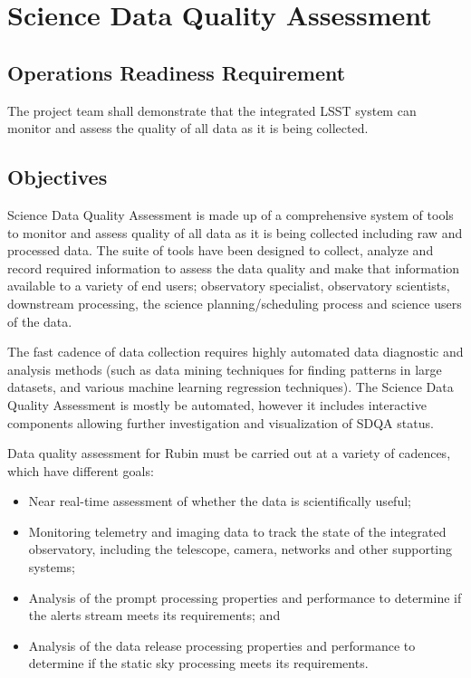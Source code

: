 \section{Science Data Quality Assessment}  \label{sec:sdqa}


\subsection{Operations Readiness Requirement}

The project team shall demonstrate that the integrated LSST system can monitor and assess the quality of all data as it is being collected.

\subsection{Objectives}

Science Data Quality Assessment is made up of a comprehensive system of tools to monitor and assess quality of all data as it is being collected including raw and processed data. The suite of tools have been designed to collect, analyze and record required information to assess the data quality and make that information available to a variety of end users; observatory specialist, observatory scientists, downstream processing, the science planning/scheduling process and science users of the data.

The fast cadence of data collection requires highly automated data diagnostic and analysis methods (such as data mining techniques for finding patterns in large datasets, and various machine learning regression techniques). The Science Data Quality Assessment is mostly be automated, however it includes interactive components allowing further investigation and visualization of SDQA status.

Data quality assessment for Rubin must be carried out at a variety of cadences, which have different goals:

\begin{itemize}

	\item Near real-time assessment of whether the data is scientifically useful;
	\item Monitoring telemetry and imaging data to track the state of the integrated observatory, including the telescope, camera, networks and other supporting systems;
	\item Analysis of the prompt processing properties and performance to determine if the alerts stream meets its requirements; and
	\item Analysis of the data release processing properties and performance to determine if the static sky processing meets its requirements.

\end{itemize}

